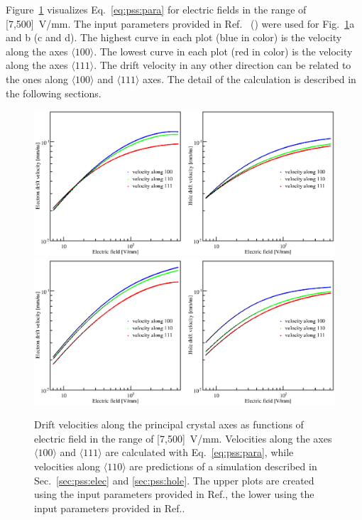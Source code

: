 Figure~\ref{fig:pss:vvse} visualizes Eq.~\ref{eq:pss:para} for electric fields in the range of [7,500]~V/mm. The input parameters provided in Ref.~\cite{miha} (\cite{bart}) were used for Fig.~\ref{fig:pss:vvse}a and b (c and d). The highest curve in each plot (blue in color) is the velocity along the axes $\langle 100 \rangle$. The lowest curve in each plot (red in color) is the velocity along the axes $\langle 111 \rangle$. The drift velocity in any other direction can be related to the ones along  $\langle 100 \rangle$ and $\langle 111 \rangle$ axes. The detail of the calculation is described in the following sections.

\begin{figure}[tbhp]
\centering
\includegraphics[width=\textwidth]{VvsElucian} \\\hfil
\includegraphics[width=\textwidth]{VvsEbart}
\caption{Drift velocities along the principal crystal axes as functions of electric field in the range of [7,500]~V/mm. Velocities along the axes $\langle 100 \rangle$ and $\langle 111 \rangle$ are calculated with Eq.~\ref{eq:pss:para}, while velocities along $\langle 110 \rangle$ are predictions of a simulation described in Sec.~\ref{sec:pss:elec} and \ref{sec:pss:hole}. The upper plots are created using the input parameters provided in Ref.\cite{miha}, the lower using the input parameters provided in Ref.\cite{bart}.}
\label{fig:pss:vvse}
\end{figure}

